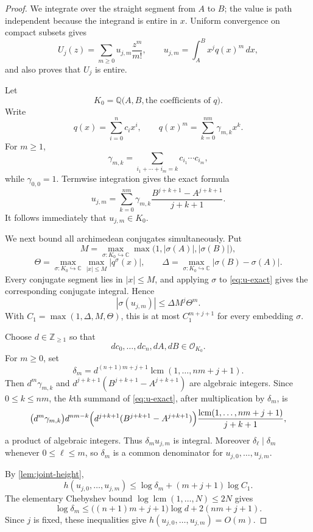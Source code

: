 \documentclass[11pt]{article}
\numberwithin{equation}{section}
\theoremstyle{definition}
\theoremstyle{remark}
\newcommand{\C}{\mathbb C}
\newcommand{\Q}{\mathbb Q}
\newcommand{\Z}{\mathbb Z}
\begin{document}
\begin{proof}
We integrate over the straight segment from $A$ to $B$; the value is path
independent because the integrand is entire in $x$.  Uniform convergence on
compact subsets gives
\[
  U_j(z)=\sum_{m\ge0}u_{j,m}\frac{z^m}{m!},
  \qquad
  u_{j,m}=\int_A^B x^j q(x)^m\,dx,
\]
and also proves that $U_j$ is entire.

Let
\[
  K_0=\Q\bigl(A,B,\text{the coefficients of }q\bigr).
\]
Write
\[
  q(x)=\sum_{i=0}^n c_i x^i,
  \qquad
  q(x)^m=\sum_{k=0}^{nm}\gamma_{m,k}x^k.
\]
For $m\ge1$,
\[
  \gamma_{m,k}
  =\sum_{i_1+\cdots+i_m=k}c_{i_1}\cdots c_{i_m},
\]
while $\gamma_{0,0}=1$.  Termwise integration gives the exact formula
\begin{equation}\label{eq:u-exact}
  u_{j,m}
  =\sum_{k=0}^{nm}\gamma_{m,k}
   \frac{B^{j+k+1}-A^{j+k+1}}{j+k+1}.
\end{equation}
It follows immediately that $u_{j,m}\in K_0$.

We next bound all archimedean conjugates simultaneously.  Put
\[
  M=\max_{\sigma:K_0\hookrightarrow\C}
     \max\bigl(1,|\sigma(A)|,|\sigma(B)|\bigr),
\]
\[
  \Theta=\max_{\sigma:K_0\hookrightarrow\C}
          \max_{|x|\le M}|q^\sigma(x)|,
  \qquad
  \Delta=\max_{\sigma:K_0\hookrightarrow\C}
          |\sigma(B)-\sigma(A)|.
\]
Every conjugate segment lies in $|x|\le M$, and applying $\sigma$ to
\eqref{eq:u-exact} gives the corresponding conjugate integral.  Hence
\[
  |\sigma(u_{j,m})|
  \le \Delta M^j\Theta^m.
\]
With $C_1=\max(1,\Delta,M,\Theta)$, this is at most
$C_1^{m+j+1}$ for every embedding $\sigma$.

Choose $d\in\Z_{\ge1}$ so that
\[
  dc_0,\ldots,dc_n,dA,dB\in\mathcal O_{K_0}.
\]
For $m\ge0$, set
\[
  \delta_m
  =d^{(n+1)m+j+1}
   \operatorname{lcm}(1,\ldots,nm+j+1).
\]
Then $d^m\gamma_{m,k}$ and
$d^{j+k+1}(B^{j+k+1}-A^{j+k+1})$ are algebraic integers.  Since
$0\le k\le nm$, the $k$th summand of \eqref{eq:u-exact}, after multiplication
by $\delta_m$, is
\[
  \bigl(d^m\gamma_{m,k}\bigr)d^{nm-k}
  \Bigl(d^{j+k+1}(B^{j+k+1}-A^{j+k+1})\Bigr)
  \frac{\operatorname{lcm}(1,\ldots,nm+j+1)}{j+k+1},
\]
a product of algebraic integers.  Thus $\delta_m u_{j,m}$ is integral.
Moreover $\delta_\ell\mid\delta_m$ whenever $0\le\ell\le m$, so $\delta_m$
is a common denominator for $u_{j,0},\ldots,u_{j,m}$.

By \cref{lem:joint-height},
\[
  h(u_{j,0},\ldots,u_{j,m})
  \le \log\delta_m+(m+j+1)\log C_1.
\]
The elementary Chebyshev bound
$\log\operatorname{lcm}(1,\ldots,N)\le2N$ gives
\[
  \log\delta_m
  \le \bigl((n+1)m+j+1\bigr)\log d+2(nm+j+1).
\]
Since $j$ is fixed, these inequalities give
$h(u_{j,0},\ldots,u_{j,m})=O(m)$.


\end{proof}
\end{document}
